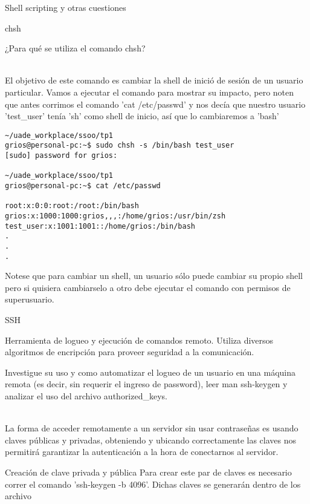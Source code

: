 \begin{section}{Shell scripting y otras cuestiones}
\begin{subsection}{chsh}

\begin{quoting}
¿Para qué se utiliza el comando chsh?
\end{quoting}\\
El objetivo de este comando es cambiar la shell de inició de sesión de un usuario particular. Vamos a ejecutar el comando para mostrar su impacto, pero noten que antes corrimos el comando 'cat /etc/passwd' y nos decía que nuestro usuario 'test\_user' tenía 'sh' como shell de inicio, así que lo cambiaremos a 'bash'
\begin{lstlisting}[style=Ubuntu]
~/uade_workplace/ssoo/tp1
grios@personal-pc:~$ sudo chsh -s /bin/bash test_user
[sudo] password for grios: 

~/uade_workplace/ssoo/tp1
grios@personal-pc:~$ cat /etc/passwd

root:x:0:0:root:/root:/bin/bash
grios:x:1000:1000:grios,,,:/home/grios:/usr/bin/zsh
test_user:x:1001:1001::/home/grios:/bin/bash
.
.
.

\end{lstlisting}
Notese que para cambiar un shell, un usuario sólo puede cambiar su propio shell pero si quisiera cambiarselo a otro debe ejecutar el comando con permisos de superusuario.
\end{subsection}

\begin{subsection}{SSH}

\begin{quoting}
Herramienta de logueo y ejecución de comandos remoto. Utiliza diversos algoritmos de
encripción para proveer seguridad a la comunicación.
\end{quoting}

\begin{quoting}
Investigue su uso y como automatizar el logueo de un usuario en una máquina remota (es decir, sin
requerir el ingreso de password), leer man ssh-keygen y analizar el uso del archivo authorized\_keys.
\end{quoting}\\
La forma de acceder remotamente a un servidor sin usar contraseñas es usando claves públicas y privadas, obteniendo y ubicando correctamente las claves nos permitirá garantizar la autenticación a la hora de conectarnos al servidor.

\begin{subsubsection}{Creación de clave privada y pública}
Para crear este par de claves es necesario correr el comando 'ssh-keygen -b 4096'. Dichas claves se generarán dentro de los archivo


\end{subsubsection}
\end{subsection}
\end{section}
